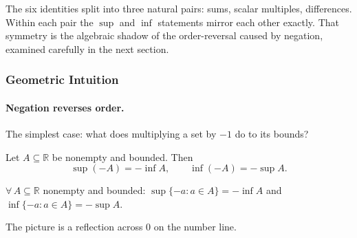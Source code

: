 \begin{remark*}
The six identities split into three natural pairs: sums, scalar multiples,
differences. Within each pair the $\sup$ and $\inf$ statements mirror each
other exactly. That symmetry is the algebraic shadow of the order-reversal
caused by negation, examined carefully in the next section.
\end{remark*}

\subsubsection{Geometric Intuition}

\paragraph{Negation reverses order.}

The simplest case: what does multiplying a set by $-1$ do to its bounds?

\begin{theorem}
\label{thm:neg-rule}
Let $A \subseteq \mathbb{R}$ be nonempty and bounded. Then
\[
\sup(-A) = -\inf A, \qquad \inf(-A) = -\sup A.
\]
\end{theorem}

\begin{remark*}
$\forall\, A \subseteq \mathbb{R}$ nonempty and bounded:
$\sup\{-a : a \in A\} = -\inf A$
and
$\inf\{-a : a \in A\} = -\sup A$.
\end{remark*}

The picture is a reflection across $0$ on the number line.

